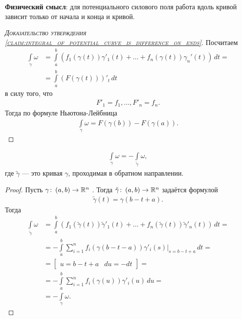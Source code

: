 \textbf{Физический смысл}: для потенциального силового поля работа вдоль кривой зависит только от начала и конца и кривой.

\begin{proof}[\normalfont\textsc{Доказательство утверждения \ref{claim:integral_of_potential_curve_is_difference_on_ends}}]
 Посчитаем
 \begin{align*}
  \int\limits_{\gamma} \omega &= \int\limits_{a}^{b} \left( f_1(\gamma(t)) \gamma'_1(t) + \ldots + f_n(\gamma(t))\gamma_n'(t) \right) \, dt = \\
  &= \int\limits_{a}^{b} \left( F(\gamma(t)) \right)'_t \, dt
 \end{align*}  в силу того, что
 \begin{align*}
  F'_1 = f_1, \ldots, F'_n = f_n
 .\end{align*} Тогда по формуле Ньютона-Лейбница
 \begin{align*}
  \int\limits_{\gamma} \omega = F(\gamma(b)) - F(\gamma(a))
 .\end{align*} 
\end{proof}

\begin{claim}
 \begin{align*}
  \int\limits_{\gamma} \omega = - \int\limits_{\tilde \gamma} \omega
 ,\end{align*} где $\tilde \gamma$ --- это кривая $\gamma$, проходимая в обратном направлении.
\end{claim}
\begin{proof}
  Пусть $\gamma \colon\, (a,b) \to \mathbb{R}^{n}$ . Тогда $\tilde \gamma \colon\, (a, b) \to \mathbb{R}^{n}$  задаётся формулой
 \begin{align*}
  \tilde \gamma (t) = \gamma(b - t + a)
 .\end{align*} Тогда
 \begin{align*}
  \int\limits_{\tilde \gamma} \omega &= \int\limits_{a}^{b} \left( f_1(\tilde \gamma(t))\tilde \gamma'_1(t) + \ldots + f_n(\tilde \gamma(t))\tilde \gamma'_n(t) \right) \, dt = \\
  &= -\int\limits_{a}^{b} \sum_{i=1}^{n} f_i(\gamma(b-t-a))\gamma'_i(s) \rvert_{s=b-t+a} \, dt = \\
  &= \begin{bmatrix}
   u = b - t + a & du = -dt
  \end{bmatrix} = \\
  &= - \int\limits_{a}^{b} \sum_{i=1}^{n} f_i(\gamma(u))\gamma'_i(u) \, du = \\
  &= -\int\limits_{\gamma} \omega
 .\end{align*} 
\end{proof}


